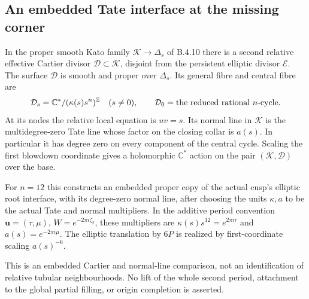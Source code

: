\subsection{An embedded Tate interface at the missing corner}

\begin{proposition}
\label{push:B420}
In the proper smooth Kato family $\mathcal K\to\Delta_s$
of B.4.10 there is a second relative effective Cartier
divisor $\mathcal D\subset\mathcal K$, disjoint from
the persistent elliptic divisor $\mathcal E$.
The surface $\mathcal D$ is smooth and proper over
$\Delta_s$. Its general fibre and central fibre are
\[
 \mathcal D_s=\mathbb C^*/(\kappa(s)s^n)^\mathbb Z
 \quad(s\ne0),\qquad
 \mathcal D_0=\hbox{the reduced rational }n\hbox{-cycle}.
\]
At its nodes the relative local equation is $uv=s$.
Its normal line in $\mathcal K$ is the multidegree-zero
Tate line whose factor on the closing collar is $a(s)$.
In particular it has degree zero on every component
of the central cycle. Scaling the first blowdown
coordinate gives a holomorphic $\mathbb C^*$ action
on the pair $(\mathcal K,\mathcal D)$ over the base.

For $n=12$ this constructs an embedded proper copy of
the actual cusp's elliptic root interface, with its
degree-zero normal line, after choosing the units
$\kappa,a$ to be the actual Tate and normal multipliers.
In the additive period convention $\mathbf u=(\tau,\mu)$,
$W=e^{-2\pi i\zeta_2}$, these multipliers are
$\kappa(s)s^{12}=e^{2\pi i\tau}$ and
$a(s)=e^{-2\pi i\mu}$. The elliptic translation by
$6P$ is realized by first-coordinate scaling
$a(s)^{-6}$.

This is an embedded Cartier and normal-line comparison,
not an identification of relative tubular neighbourhoods.
No lift of the whole second period, attachment to the
global partial filling, or origin completion is asserted.
\end{proposition}

